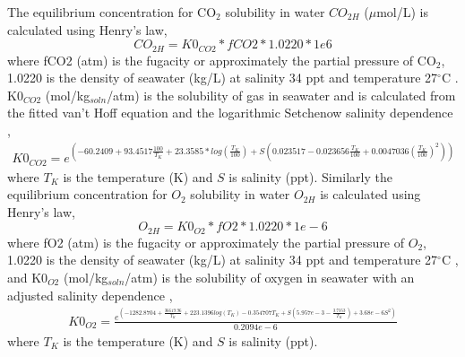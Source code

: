 \documentclass{ruthesis}
\begin{document}
The equilibrium concentration for CO$_2$ solubility in water $CO_{2H}$ ($\mu$mol/L) is calculated using Henry's law,
\begin{equation}\label{eq:CO2H_eq}
CO_{2H}=K0_{CO2}*fCO2*1.0220*1e6
\end{equation}
where fCO2 (atm) is the fugacity or approximately the partial pressure of CO$_2$, 1.0220 is the density of seawater (kg/L) at salinity 34 ppt and temperature 27$^{\circ}$C \cite{ramsing2011seawater} \cite{greensberg1992standard}. K0$_{CO2}$ (mol/kg$_{soln}$/atm) is the solubility of gas in seawater and is calculated from the fitted van't Hoff equation and the logarithmic Setchenow salinity dependence \cite{weiss1974carbon},
\begin{equation}
\begin{aligned}
K0_{CO2} = e^{(- 60.2409 + 93.4517\frac{100}{T_K}  + 23.3585*log(\frac{T_K}{100})+ 
S(0.023517 - 0.023656\frac{T_K}{100} + 0.0047036(\frac{T_K}{100})^2))}
\end{aligned}
\end{equation}
where $T_K$ is the temperature (K) and $S$ is salinity (ppt).
Similarly the equilibrium concentration for $O_2$ solubility in water $O_{2H}$ is calculated using Henry's law,
\begin{equation}\label{eq:O2H_eq}
O_{2H}=K0_{O2}*fO2*1.0220*1e-6
\end{equation}
where fO2 (atm) is the fugacity or approximately the partial pressure of $O_2$, 1.0220 is the density of seawater (kg/L) at salinity 34 ppt and temperature 27$^{\circ}$C \cite{ramsing2011seawater} \cite{greensberg1992standard}, and K0$_{O2}$ (mol/kg$_{soln}$/atm) is the solubility of oxygen in seawater with an adjusted salinity dependence \cite{battino1983solubility},
\begin{equation}
\begin{aligned}
K0_{O2} =  \frac{e^{(-1282.8704 + \frac{36619.96}{T_K} + 223.1396 log(T_K) -0.354707 T_K 
+ S(5.957e-3 -\frac{3.7353}{T_K}) + 3.68e-6 S^2)}}{0.2094e-6}
\end{aligned}
\end{equation}
where $T_K$ is the temperature (K) and $S$ is salinity (ppt).
\end{document}
